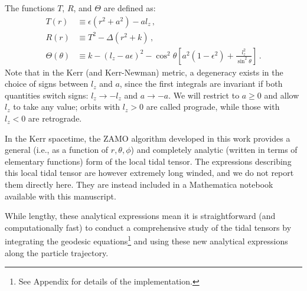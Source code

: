 \documentclass[
    reprint,
    prd,
    nofootinbib,
    amsmath,amssymb,
    aps,
    floatfix,
]{revtex4-2}
\begin{document}
The functions $T$, $R$, and $\Theta$ are defined as:
\begin{equation}
    \begin{split}
        T(r) &\equiv \epsilon (r^{2} + a^{2}) - al_{z} \, , \\
        R(r) &\equiv T^{2} - \Delta (r^{2} + k) \, , \\
        \Theta(\theta) &\equiv k - (l_{z} - a\epsilon)^{2} - \cos^{2}{\theta} \left[ a^{2} (1 - \epsilon^{2}) + \frac{l_{z}^{2}}{\sin^{2}{\theta}} \right] \, .
    \end{split}
\end{equation} 
Note that in the Kerr (and Kerr-Newman) metric, a degeneracy exists in the choice of signs between $l_{z}$ and $a$, since the first integrals are invariant if both quantities switch signs: $l_{z} \to -l_{z}$ and $a \to -a$. We will restrict to $a \ge 0$ and allow $l_{z}$ to take any value; orbits with $l_{z} > 0$ are called prograde, while those with $l_{z} < 0$ are retrograde.

In the Kerr spacetime, the ZAMO algorithm {developed in this work provides a general (i.e., as a function of $r, \theta, \phi$) and completely analytic (written in terms of elementary functions) form of the local tidal tensor.} {The} expressions {describing this local tidal tensor are however}  extremely {long winded, and we do not report them directly here. They are instead included in a Mathematica notebook available with this manuscript}. 

{While lengthy, these analytical expressions mean} it is straightforward (and computationally fast) to conduct a {comprehensive} study of the tidal tensors by integrating the geodesic equations\footnote{See Appendix for details of the implementation.} {and using these new analytical expressions along the particle trajectory}. 
\end{document}
